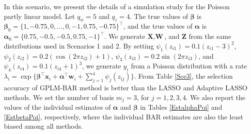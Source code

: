 \documentclass[11pt]{article}
\begin{document}
In this scenario, we present the details of a simulation study for the Poisson partly linear model. Let $q_w = 5$ and $q_z = 4$. The true values of $\boldsymbol{\beta}$ is $\boldsymbol{\beta}_0 = \{1,-0.75,0,\ldots,0,-1,0.75,-0.75\}^\top$, and the true values of $\boldsymbol{\alpha}$ is $\boldsymbol{\alpha}_0 = \{ 0.75,-0.5,-0.5,0.75,-1\}^\top$. We generate $\textbf{X}, \textbf{W}$, and $\textbf{Z}$ from the same distributions used in Scenarios 1 and 2. By setting $\psi_1(z_{i1}) = 0.1(z_{i1}-3)^2$, $\psi_2(z_{i2}) = 0.2(\cos(2\pi z_{i2})+1)$, $\psi_3(z_{i3}) = 0.2\sin(2\pi z_{i3})$, and $\psi_4 (z_{i4}) = 0.1(z_{i4}+1)^3$, we generate $y_i$ from a Poisson distribution with a rate $\lambda_i = \exp \{\boldsymbol{\beta}^\top \textbf{x}_i + \boldsymbol{\alpha}^\top \textbf{w}_i + \sum^4_{j=1} \psi_j(z_{ij}) \}$. From Table \ref{Sce3}, the selection accuracy of GPLM-BAR method is better than the LASSO and Adaptive LASSO methods. We set the number of basis $m_j = 3$, for $j=1,2,3,4$. We also report the values of the individual estimates of $\boldsymbol{\alpha}$ and $\boldsymbol{\beta}$ in Tables \ref{EstalphaPoi} and \ref{EstbetaPoi}, respectively, where the individual BAR estimates are also the least biased among all methods. 
\end{document}
